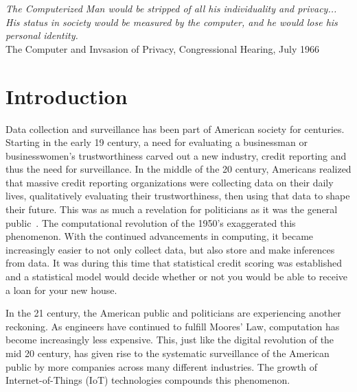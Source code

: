 \begin{center}
\textit{
The Computerized Man would be stripped of all his individuality and privacy...
His status in society would be measured by the computer,
and he would lose his \\ personal identity.} \\
The Computer and Invsasion of Privacy, Congressional Hearing, July 1966
\end{center}

\section{Introduction}

Data collection and surveillance has been part of American society for
centuries. Starting in the early 19 century, a need for evaluating a
businessman or businesswomen's trustworthiness carved out a new industry,
credit reporting and thus the need for surveillance. In the middle of the 20 century, Americans realized
that massive credit reporting organizations were collecting data on their
daily lives, qualitatively evaluating their trustworthiness, then using that
data to shape their future. This was as much a revelation for politicians as it
was the general public~\cite{lauer2017creditworthy}. The computational revolution of the 1950's exaggerated
this phenomenon. With the continued advancements in computing, it became
increasingly easier to not only collect data, but also store and make
inferences from data. It was during this time that statistical credit scoring
was established and a statistical model would decide whether or not you would
be able to receive a loan for your new house.

In the 21 century, the American public and politicians are experiencing
another reckoning. As engineers have continued to fulfill Moores' Law,
computation has become increasingly less expensive. This, just like the digital
revolution of the mid 20 century, has given rise to the systematic
surveillance of the American public by more companies across many different industries. The growth of Internet-of-Things (IoT)
technologies compounds this phenomenon.

